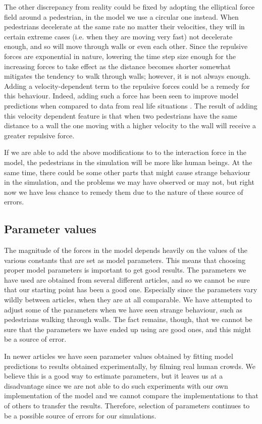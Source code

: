 The other discrepancy from reality could be fixed by adopting the elliptical 
force field around a pedestrian, in the model we use a circular one instead. 
When pedestrians decelerate at the same rate no matter their velocities, they 
will in certain extreme cases (i.e. when they are moving very fast) not 
decelerate enough, and so will move through walls or even each other. Since 
the repulsive forces are exponential in nature, lowering the time step size 
enough for the increasing forces to take effect as the distance becomes 
shorter somewhat mitigates the tendency to walk through walls; however, it is 
not always enough. Adding a velocity-dependent term to the repulsive forces 
could be a remedy for this behaviour. Indeed, adding such a force has been 
seen to improve model predictions when compared to data from real life 
situations \cite{ABconstant}.
The result of adding this velocity dependent feature is that when two pedestrians 
have the same distance to a wall the one moving with a 
higher velocity to the wall will receive a greater repulsive force.

If we are able to add the above modifications to to the interaction force in 
the model, the pedestrians in the simulation will be more like human beings. 
At the same time, there could be some other parts that might cause strange 
behaviour in the simulation, and the problems we may have observed or may not, 
but right now we have less chance to remedy them due to the nature of these 
source of errors.

\subsection{Parameter values}
The magnitude of the forces in the model depends heavily on the values of the 
various constants that are set as model parameters. This means that choosing 
proper model parameters is important to get good results. The parameters we have 
used are obtained from several different articles, and so we cannot be sure 
that our starting point has been a good one. Especially since the parameters 
vary wildly between articles, when they are at all comparable. We have 
attempted to adjust some of the parameters when we have seen strange 
behaviour, such as pedestrians walking through walls. The fact remains, 
though, that we cannot be sure that the parameters we have ended up using are 
good ones, and this might be a source of error.

In newer articles we have seen parameter values obtained by fitting model 
predictions to results obtained experimentally, by filming real human crowds.  
We believe this is a good way to estimate parameters, but it leaves us at a 
disadvantage since we are not able to do such experiments with our own 
implementation of the model and we cannot compare the implementations to that 
of others to transfer the results. Therefore, selection of parameters 
continues to be a possible source of errors for our simulations.

